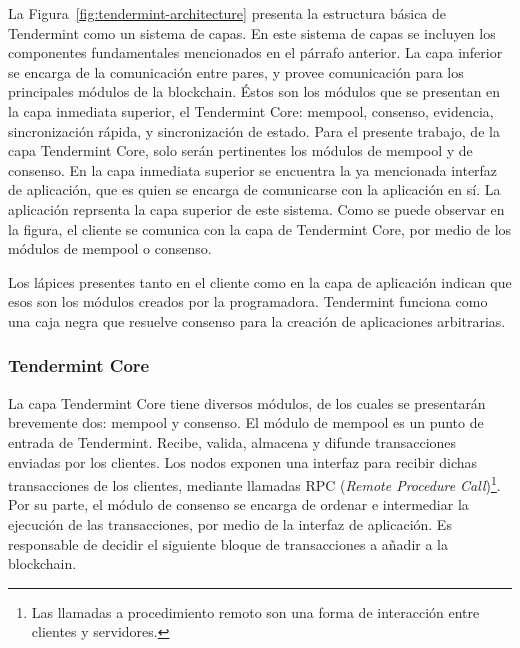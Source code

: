 La Figura~\ref{fig:tendermint-architecture} presenta la estructura básica de Tendermint como un sistema de capas.
%
En este sistema de capas se incluyen los componentes fundamentales mencionados en el párrafo anterior.
%
La capa inferior se encarga de la comunicación entre pares, y provee comunicación para los principales
módulos de la blockchain.
%
Éstos son los módulos que se presentan en la capa inmediata superior, el
Tendermint Core: mempool, consenso, evidencia, sincronización rápida, y sincronización de estado.
%
Para el presente trabajo, de la capa Tendermint Core, solo serán pertinentes los módulos de mempool y de consenso.
%
En la capa inmediata superior se encuentra la ya mencionada interfaz de aplicación, que es quien se encarga de comunicarse
con la aplicación en sí.
%
La aplicación reprsenta la capa superior de este sistema.
%
Como se puede observar en la figura, el cliente se comunica con la capa de Tendermint Core, por medio de los
módulos de mempool o consenso. 

Los lápices presentes tanto en el cliente como en la capa de aplicación indican que esos son los módulos creados
por la programadora.
%
Tendermint funciona como una caja negra que resuelve consenso para la creación de aplicaciones arbitrarias.
%

\subsubsection{Tendermint Core}

La capa Tendermint Core tiene diversos módulos, de los cuales se presentarán brevemente dos: mempool y consenso.
%
El módulo de mempool es un punto de entrada de Tendermint.
%
Recibe, valida, almacena y difunde transacciones enviadas por los clientes. 
%
%
Los nodos exponen una interfaz para recibir dichas transacciones de los clientes, mediante llamadas
RPC (\textit{Remote Procedure Call})\footnote{Las llamadas a procedimiento remoto son una forma de
interacción entre clientes y servidores.}.
%
%
%
Por su parte, el módulo de consenso se encarga de ordenar e intermediar la ejecución de las transacciones, por medio de la
interfaz de aplicación. Es responsable de decidir el siguiente bloque de transacciones a añadir a la blockchain.

